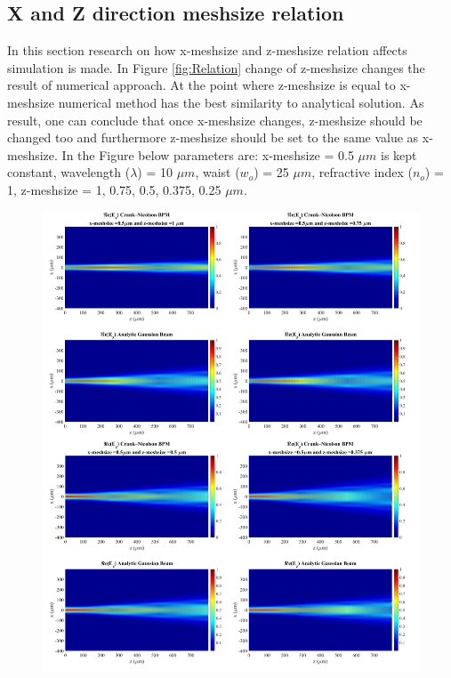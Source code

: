 \documentclass[a4paper]{article}
\begin{document}
	\subsection{X and Z direction meshsize relation}
	In this section research on how x-meshsize and z-meshsize relation affects simulation is made. In Figure \ref{fig:Relation} change of z-meshsize changes the result of numerical approach. At the point where z-meshsize is equal to x-meshsize numerical method has the best similarity to analytical solution. As result, one can conclude that once x-meshsize changes, z-meshsize should be changed too and furthermore z-meshsize should be set to the same value as x-meshsize. In the Figure below parameters are: x-meshsize  = 0.5 $\mu m$ is kept constant, wavelength ($\lambda$) = 10 $\mu m$, waist ($w_o$) = 25 $\mu m$, refractive index ($n_o$) = 1, z-meshsize = 1, 0.75, 0.5, 0.375, 0.25 $\mu m$.
%	
	\begin{figure}[H]
		\hspace{-22.5mm}
		\includegraphics[width=1.35\textwidth]{change1234.jpg}	
	\end{figure}
	
\end{document}
